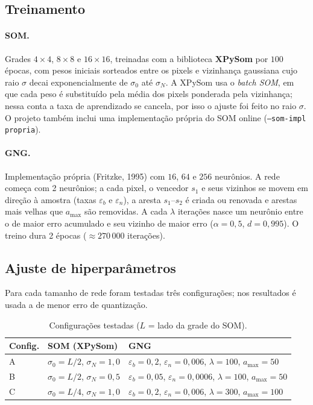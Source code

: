 \documentclass[11pt,a4paper]{article}
\begin{document}
\subsection{Treinamento}

\paragraph{SOM.} Grades $4\times4$, $8\times8$ e $16\times16$, treinadas com a biblioteca
\textbf{XPySom} por $100$ épocas, com pesos iniciais sorteados entre os pixels e vizinhança
gaussiana cujo raio $\sigma$ decai exponencialmente de $\sigma_0$ até $\sigma_N$. A XPySom usa o
\emph{batch SOM}, em que cada peso é substituído pela média dos pixels ponderada pela vizinhança;
nessa conta a taxa de aprendizado se cancela, por isso o ajuste foi feito no raio $\sigma$. O
projeto também inclui uma implementação própria do SOM online (\texttt{--som-impl propria}).

\paragraph{GNG.} Implementação própria (Fritzke, 1995) com $16$, $64$ e $256$ neurônios. A rede
começa com 2 neurônios; a cada pixel, o vencedor $s_1$ e seus vizinhos se movem em direção à
amostra (taxas $\varepsilon_b$ e $\varepsilon_n$), a aresta $s_1$--$s_2$ é criada ou renovada e
arestas mais velhas que $a_{\max}$ são removidas. A cada $\lambda$ iterações nasce um neurônio
entre o de maior erro acumulado e seu vizinho de maior erro ($\alpha=0{,}5$, $d=0{,}995$). O treino
dura 2 épocas ($\approx 270\,000$ iterações).

\subsection{Ajuste de hiperparâmetros}
Para cada tamanho de rede foram testadas três configurações; nos resultados é usada a de menor
erro de quantização.

\begin{table}[H]
\centering\small
\begin{tabular}{lll}
\toprule
Config. & SOM (XPySom) & GNG \\
\midrule
A & $\sigma_0=L/2$, $\sigma_N=1{,}0$ & $\varepsilon_b=0{,}2$, $\varepsilon_n=0{,}006$, $\lambda=100$, $a_{\max}=50$ \\
B & $\sigma_0=L/2$, $\sigma_N=0{,}5$ & $\varepsilon_b=0{,}05$, $\varepsilon_n=0{,}0006$, $\lambda=100$, $a_{\max}=50$ \\
C & $\sigma_0=L/4$, $\sigma_N=1{,}0$ & $\varepsilon_b=0{,}2$, $\varepsilon_n=0{,}006$, $\lambda=300$, $a_{\max}=100$ \\
\bottomrule
\end{tabular}
\caption{Configurações testadas ($L$ = lado da grade do SOM).}
\label{tab:cfg}
\end{table}
\end{document}
